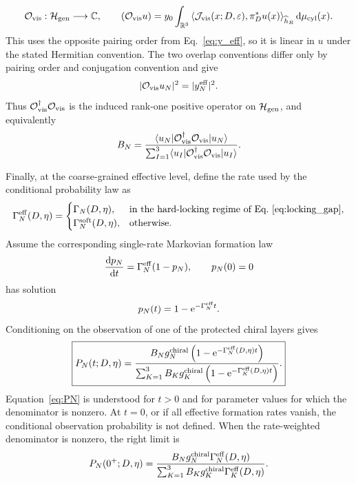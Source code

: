 \documentclass[aps,prd,preprint,notitlepage,nofootinbib,superscriptaddress,floatfix]{revtex4-2}
\newcommand{\dd}{\mathrm{d}}
\newcommand{\ee}{\mathrm{e}}
\newcommand{\cH}{\mathcal H}
\theoremstyle{remark}
\begin{document}
\begin{equation}
\mathcal O_{\rm vis}:\cH_{\rm gen}\longrightarrow\mathbb C,
\qquad
(\mathcal O_{\rm vis}u)
=
y_0
\int_{\mathbb R^3}
\left\langle
\mathcal J_{\rm vis}(x;D,\varepsilon),
\pi_D^*u(x)
\right\rangle_{\widehat h_R}
\dd\mu_{\rm cyl}(x).
\label{eq:Ovis_def}
\end{equation}
This uses the opposite pairing order from Eq.~\eqref{eq:y_eff}, so it is linear in \(u\) under the stated Hermitian convention.
The two overlap conventions differ only by pairing order and conjugation convention and give
\begin{equation}
|\mathcal O_{\rm vis}u_N|^2=|y_N^{\rm eff}|^2.
\end{equation}
Thus \(\mathcal O_{\rm vis}^\dagger\mathcal O_{\rm vis}\) is the induced rank-one positive operator on \(\cH_{\rm gen}\), and equivalently
\begin{equation}
B_N
=
\frac{\langle u_N|\mathcal O_{\rm vis}^\dagger\mathcal O_{\rm vis}|u_N\rangle}
{\sum_{I=1}^{3}
\langle u_I|\mathcal O_{\rm vis}^\dagger\mathcal O_{\rm vis}|u_I\rangle}.
\end{equation}

Finally, at the coarse-grained effective level, define the rate used by the conditional probability law as
\begin{equation}
\Gamma_N^{\rm eff}(D,\eta)
=
\begin{cases}
\Gamma_N(D,\eta), & \text{in the hard-locking regime of Eq.~\eqref{eq:locking_gap}},\\
\Gamma_N^{\rm soft}(D,\eta), & \text{otherwise}.
\end{cases}
\label{eq:Gamma_eff}
\end{equation}
Assume the corresponding single-rate Markovian formation law
\begin{equation}
\frac{\dd p_N}{\dd t}=\Gamma_N^{\rm eff}(1-p_N),
\qquad
p_N(0)=0
\end{equation}
has solution
\begin{equation}
p_N(t)=1-\ee^{-\Gamma_N^{\rm eff}t}.
\end{equation}
Conditioning on the observation of one of the protected chiral layers gives
\begin{equation}
\boxed{
P_N(t;D,\eta)
=
\frac{
B_Ng_N^{\rm chiral}\left(1-\ee^{-\Gamma_N^{\rm eff}(D,\eta)t}\right)
}{
\sum_{K=1}^{3}
B_Kg_K^{\rm chiral}\left(1-\ee^{-\Gamma_K^{\rm eff}(D,\eta)t}\right)
}.
}
\label{eq:PN}
\end{equation}
Equation~\eqref{eq:PN} is understood for \(t>0\) and for parameter values for which the denominator is nonzero.
At \(t=0\), or if all effective formation rates vanish, the conditional observation probability is not defined.
When the rate-weighted denominator is nonzero, the right limit is
\begin{equation}
P_N(0^+;D,\eta)
=
\frac{
B_Ng_N^{\rm chiral}\Gamma_N^{\rm eff}(D,\eta)
}{
\sum_{K=1}^{3}
B_Kg_K^{\rm chiral}\Gamma_K^{\rm eff}(D,\eta)
}.
\label{eq:PN_zero_plus}
\end{equation}
\end{document}
